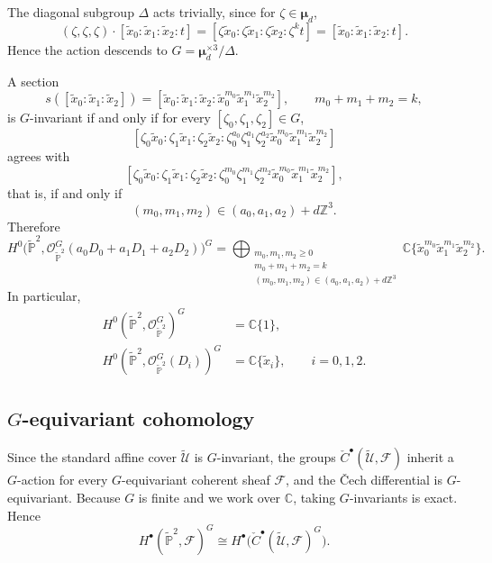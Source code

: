 \documentclass[dvipsnames,11pt]{article}
\theoremstyle{definition}
\newcommand{\cO}{\mathcal{O}}
\newcommand{\Z}{{\mathbb Z}}
\newcommand{\C}{{\mathbb C}}
\renewcommand{\P}{{\mathbb P}}
\newcommand{\bmu}{\bm \mu}
\begin{document}
\begin{appendices}
The diagonal subgroup \(\Delta\) acts trivially, since for \(\zeta\in \bmu_d\),
\[
(\zeta,\zeta,\zeta)\cdot [\widetilde x_0:\widetilde x_1:\widetilde x_2:t]
=
[\zeta \widetilde x_0:\zeta \widetilde x_1:\zeta \widetilde x_2:\zeta^k t]
=
[\widetilde x_0:\widetilde x_1:\widetilde x_2:t].
\]
Hence the action descends to \(G=\bmu_d^{\times 3}/\Delta\).

A section
\[
s([\widetilde x_0:\widetilde x_1:\widetilde x_2])
=
[\widetilde x_0:\widetilde x_1:\widetilde x_2:\widetilde x_0^{m_0}\widetilde x_1^{m_1}\widetilde x_2^{m_2}],
\qquad m_0+m_1+m_2=k,
\]
is \(G\)-invariant if and only if for every \([\zeta_0,\zeta_1,\zeta_2]\in G\),
\[
[\zeta_0\widetilde x_0:\zeta_1\widetilde x_1:\zeta_2\widetilde x_2:
\zeta_0^{a_0}\zeta_1^{a_1}\zeta_2^{a_2}
\widetilde x_0^{m_0}\widetilde x_1^{m_1}\widetilde x_2^{m_2}]
\]
agrees with
\[
[\zeta_0\widetilde x_0:\zeta_1\widetilde x_1:\zeta_2\widetilde x_2:
\zeta_0^{m_0}\zeta_1^{m_1}\zeta_2^{m_2}
\widetilde x_0^{m_0}\widetilde x_1^{m_1}\widetilde x_2^{m_2}],
\]
that is, if and only if
\[
(m_0,m_1,m_2)\in (a_0,a_1,a_2)+d\Z^3.
\]
Therefore
\begin{equation*}
H^0\!\bigl(\widetilde{\P}^2,\cO^G_{\widetilde{\P}^2}(a_0D_0+a_1D_1+a_2D_2)\bigr)^G
=
\bigoplus_{\substack{
m_0,m_1,m_2\ge 0\\
m_0+m_1+m_2=k\\
(m_0,m_1,m_2)\in (a_0,a_1,a_2)+d\Z^3
}}
\C\{\widetilde x_0^{m_0}\widetilde x_1^{m_1}\widetilde x_2^{m_2}\}.
\end{equation*}
In particular,
\begin{align}
H^0(\widetilde{\P}^2,\cO^G_{\widetilde{\P}^2})^G
&=\C\{1\},
\nonumber\\
H^0(\widetilde{\P}^2,\cO^G_{\widetilde{\P}^2}(D_i))^G
&=\C\{\widetilde x_i\},
\qquad i=0,1,2.
\label{eq:h0G}
\end{align}


\subsection{\texorpdfstring{$G$}{G}-equivariant cohomology}

Since the standard affine cover \(\widetilde{\mathcal U}\) is \(G\)-invariant, the groups \(\check C^\bullet(\widetilde{\mathcal U},\mathcal F)\) inherit a \(G\)-action for every \(G\)-equivariant coherent sheaf \(\mathcal F\), and the \v Cech differential is \(G\)-equivariant. Because \(G\) is finite and we work over \(\C\), taking \(G\)-invariants is exact. Hence
\[
H^\bullet(\widetilde{\P}^2,\mathcal F)^G
\cong
H^\bullet\bigl(\check C^\bullet(\widetilde{\mathcal U},\mathcal F)^G\bigr).
\]


\end{appendices}
\end{document}
